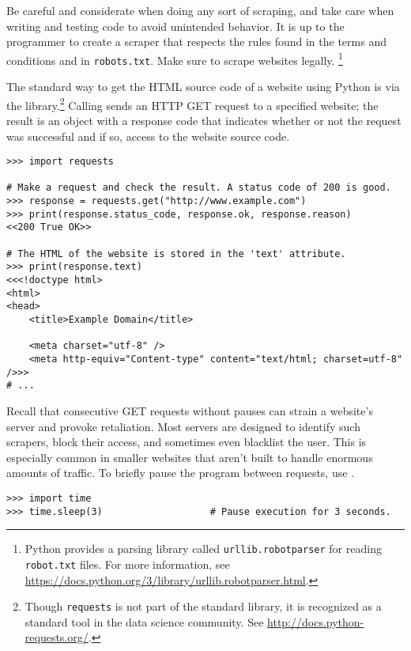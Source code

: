 \begin{warn} %
Be careful and considerate when doing any sort of scraping, and take care when writing and testing code to avoid unintended behavior.
It is up to the programmer to create a scraper that respects the rules found in the terms and conditions and in \texttt{robots.txt}.
Make sure to scrape websites legally.
\footnote{Python provides a parsing library called \texttt{urllib.robotparser} for reading \texttt{robot.txt} files.
For more information, see \url{https://docs.python.org/3/library/urllib.robotparser.html}.
}
\end{warn}

The standard way to get the HTML source code of a website using Python is via the  library.\footnote{Though \texttt{requests} is not part of the standard library, it is recognized as a standard tool in the data science community. See \url{http://docs.python-requests.org/}.}
Calling  sends an HTTP GET request to a specified website; the result is an object with a response code that indicates whether or not the request was successful and if so, access to the website source code.

\begin{lstlisting}
>>> import requests

# Make a request and check the result. A status code of 200 is good.
>>> response = requests.get("http://www.example.com")
>>> print(response.status_code, response.ok, response.reason)
<<200 True OK>>

# The HTML of the website is stored in the 'text' attribute.
>>> print(response.text)
<<<!doctype html>
<html>
<head>
    <title>Example Domain</title>

    <meta charset="utf-8" />
    <meta http-equiv="Content-type" content="text/html; charset=utf-8" />>>
# ...
\end{lstlisting}

Recall that consecutive GET requests without pauses can strain a website's server and provoke retaliation.
Most servers are designed to identify such scrapers, block their access, and sometimes even blacklist the user.
This is especially common in smaller websites that aren't built to handle enormous amounts of traffic.
To briefly pause the program between requests, use .
\begin{lstlisting}
>>> import time
>>> time.sleep(3)                   # Pause execution for 3 seconds.
\end{lstlisting}

